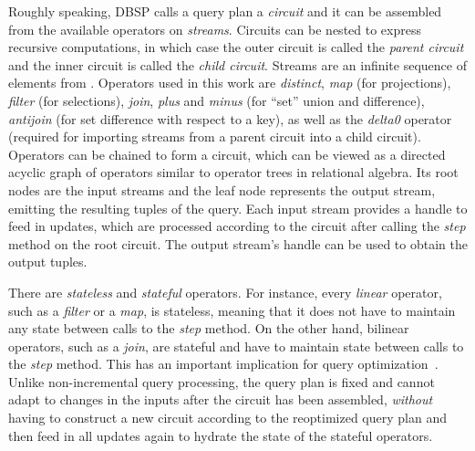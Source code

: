 
Roughly speaking, DBSP calls a query plan a \emph{circuit}
and it can be assembled from the available operators on \emph{streams}.
Circuits can be nested to express recursive computations, in which case
the outer circuit is called the \emph{parent circuit} and the inner circuit
is called the \emph{child circuit}.
Streams are an infinite sequence of elements from \zsets{}.
Operators used in this work are \emph{distinct},
\emph{map} (for projections), \emph{filter} (for selections),
\emph{join}, \emph{plus} and \emph{minus} (for ``set'' union and difference),
\emph{antijoin} (for set difference with respect to a key),
as well as the \emph{delta0} operator (required for importing streams
from a parent circuit into a child circuit).
Operators can be chained to form a circuit, which can be viewed as
a directed acyclic graph of operators similar to operator trees in relational algebra.
Its root nodes are the input streams and the leaf node represents the output
stream, emitting the resulting tuples of the query.
Each input stream provides a handle to feed in updates, which are processed
according to the circuit after calling the \emph{step} method on the root
circuit.
The output stream's handle can be used to obtain the output tuples.

There are \emph{stateless} and \emph{stateful} operators.
For instance, every \emph{linear} operator, such as a \emph{filter} or a \emph{map},
is stateless, meaning that it does not have to maintain any state between
calls to the \emph{step} method.
On the other hand, bilinear operators, such as a \emph{join}, are stateful
and have to maintain state between calls to the \emph{step} method.
This has an important implication for query optimization~\cite{budiu2025dbsp}.
Unlike non-incremental query processing, the query plan is fixed and cannot
adapt to changes in the inputs after the circuit has been assembled,
\emph{without} having to construct a new circuit according to the
reoptimized query plan and then feed in all updates again to hydrate
the state of the stateful operators.
